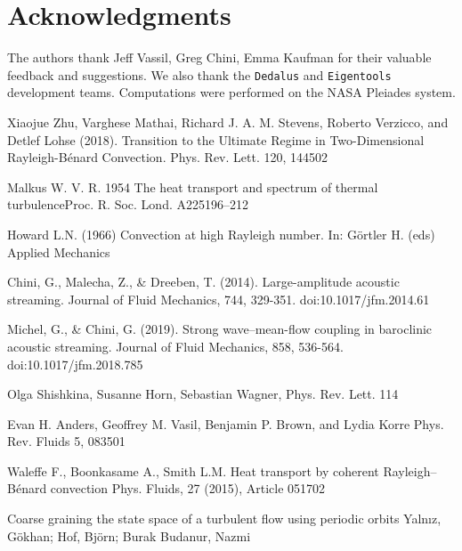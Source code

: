 \documentclass[reprint,amsmath,amssymb,aps]{revtex4-1}
\begin{document}
\section*{Acknowledgments}
The authors thank Jeff Vassil, Greg Chini, Emma Kaufman for their valuable feedback and suggestions. 
We also thank the \texttt{Dedalus} and \texttt{Eigentools} development teams. 
Computations were performed on the NASA Pleiades system.

% 
\begin{thebibliography}{99} 

 Xiaojue Zhu, Varghese Mathai, Richard J. A. M. Stevens, Roberto Verzicco, and Detlef Lohse (2018). Transition to the Ultimate Regime in Two-Dimensional Rayleigh-Bénard Convection. Phys. Rev. Lett. 120, 144502

 Malkus W. V. R. 1954 The heat transport and spectrum of thermal turbulenceProc. R. Soc. Lond. A225196–212

 Howard L.N. (1966) Convection at high Rayleigh number. In: Görtler H. (eds) Applied Mechanics

 Chini, G., Malecha, Z., \& Dreeben, T. (2014). Large-amplitude acoustic streaming. Journal of Fluid Mechanics, 744, 329-351. doi:10.1017/jfm.2014.61

 Michel, G., \& Chini, G. (2019). Strong wave–mean-flow coupling in baroclinic acoustic streaming. Journal of Fluid Mechanics, 858, 536-564. doi:10.1017/jfm.2018.785

 Olga Shishkina, Susanne Horn, Sebastian Wagner, Phys. Rev. Lett. 114

 Evan H. Anders, Geoffrey M. Vasil, Benjamin P. Brown, and Lydia Korre Phys. Rev. Fluids 5, 083501

 Waleffe F., Boonkasame A., Smith L.M. Heat transport by coherent Rayleigh–Bénard convection Phys. Fluids, 27 (2015), Article 051702

 Coarse graining the state space of a turbulent flow using periodic orbits Yalnız, Gökhan; Hof, Björn; Burak Budanur, Nazmi

\end{thebibliography}
\end{document}
